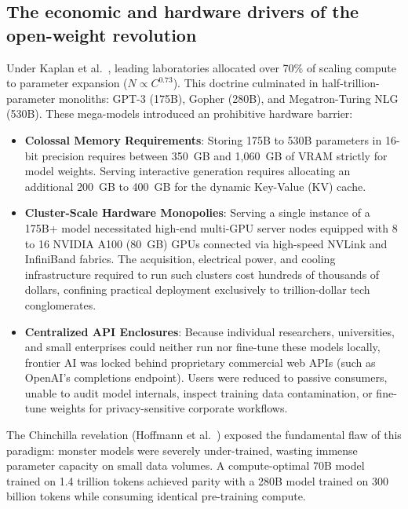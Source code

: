\documentclass[../../main.tex]{subfiles}
\begin{document}
\subsection{The economic and hardware drivers of the open-weight revolution}
\label{subsec:open_weights_economic_drivers}

Under Kaplan et al.~\cite{kaplan2020}, leading laboratories allocated over 70\% of scaling compute to parameter expansion ($N \propto C^{0.73}$). This doctrine culminated in half-trillion-parameter monoliths: GPT-3 (175B), Gopher (280B), and Megatron-Turing NLG (530B). These mega-models introduced an prohibitive hardware barrier:
\begin{itemize}
    \item \textbf{Colossal Memory Requirements}: Storing 175B to 530B parameters in 16-bit precision requires between 350~GB and 1,060~GB of VRAM strictly for model weights. Serving interactive generation requires allocating an additional 200~GB to 400~GB for the dynamic Key-Value (KV) cache.
    \item \textbf{Cluster-Scale Hardware Monopolies}: Serving a single instance of a 175B+ model necessitated high-end multi-GPU server nodes equipped with 8 to 16 NVIDIA A100 (80~GB) GPUs connected via high-speed NVLink and InfiniBand fabrics. The acquisition, electrical power, and cooling infrastructure required to run such clusters cost hundreds of thousands of dollars, confining practical deployment exclusively to trillion-dollar tech conglomerates.
    \item \textbf{Centralized API Enclosures}: Because individual researchers, universities, and small enterprises could neither run nor fine-tune these models locally, frontier AI was locked behind proprietary commercial web APIs (such as OpenAI's completions endpoint). Users were reduced to passive consumers, unable to audit model internals, inspect training data contamination, or fine-tune weights for privacy-sensitive corporate workflows.
\end{itemize}

The Chinchilla revelation (Hoffmann et al.~\cite{hoffmann2022}) exposed the fundamental flaw of this paradigm: monster models were severely under-trained, wasting immense parameter capacity on small data volumes. A compute-optimal 70B model trained on 1.4 trillion tokens achieved parity with a 280B model trained on 300 billion tokens while consuming identical pre-training compute.
\end{document}
